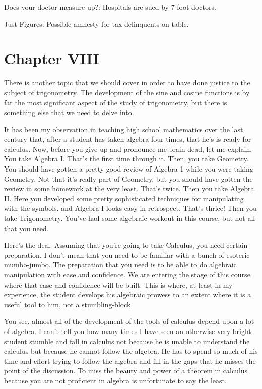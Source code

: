 \documentclass[english]{book}
\begin{document}
\vspace{2cm}

\begin{center}
Does your doctor measure up?: Hospitals are sued by 7 foot doctors.
\vspace{0.5cm}

Just Figures: Possible amnesty for tax delinquents on table.
\end{center}



\chapter*{Chapter VIII}


There is another topic that we should cover in order to have done justice to the subject of trigonometry. The development of the sine and cosine functions is by far the most significant aspect of the study of trigonometry, but there is something else that we need to
delve into. 

It has been my observation in teaching high school mathematics over the last century that, after a student has taken algebra four times, that he's is ready for calculus. Now, before you give up and pronounce me brain-dead, let me explain. You take Algebra I. That's the first time through it. Then, you take Geometry. You should have gotten a pretty good review of Algebra 1 while you were taking Geometry. Not that it's really part of Geometry, but you should have gotten the review in some homework at the very least. That's twice. Then you take Algebra II. Here you developed some pretty sophisticated techniques for manipulating with the symbols, and Algebra I looks easy in retrospect. That's thrice! Then you take Trigonometry. You've had some algebraic workout in this course, but not all that you need. 

Here's the deal. Assuming that you're going to take Calculus, you need certain preparation. I don't mean that you need to be familiar with a bunch of esoteric mumbo-jumbo. The preparation that you need is to be able to do algebraic manipulation with ease and confidence. We are entering the stage of this course where that ease and confidence will be built. This is where, at least in my experience, the student develops his algebraic prowess to an extent where it is a useful tool to him, not a stumbling-block. 

You see, almost all of the development of the tools of calculus depend upon a lot of algebra. I can't tell you how many times I have seen an otherwise very bright student stumble and fall in calculus not because he is unable to understand the calculus but because he cannot follow the algebra. He has to spend so much of his time and effort trying to follow the algebra and fill in the gaps that he misses the point of the discussion. To miss the beauty and power of a theorem in calculus because you are not proficient in algebra is unfortunate to say the least. 
\end{document}
